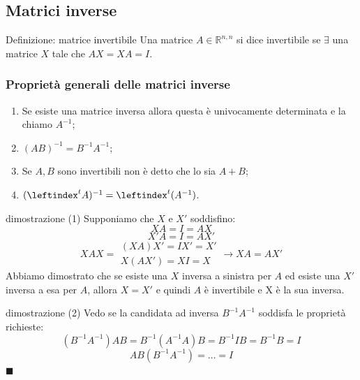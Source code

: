 \documentclass[x11names]{article}
\newcommand*{\QEDA}{\null\nobreak\hfill\ensuremath{\blacksquare}}%
\begin{document}
\subsection{Matrici inverse}
\begin{center}
\colorbox{Azure2}{\begin{minipage}{5.75in}
\begin{blues}{Definizione: matrice invertibile}
    Una matrice $A \in \mathbb{R}^{n,n}$ si dice invertibile se $\exists$ una matrice $X$ tale che $AX = XA = I$.
\end{blues}
\end{minipage}}        
\end{center}
\subsubsection*{Proprietà generali delle matrici inverse}
\begin{enumerate}
    \item Se esiste una matrice inversa allora questa è univocamente determinata e la chiamo $A^{-1}$;
    \item $(AB)^{-1} = B^{-1}A^{-1}$;
    \item Se $A,B$ sono invertibili non è detto che lo sia $A+B$;
    \item $(\leftindex ^t{A})^{-1} = \leftindex ^t(A^{-1})$.
\end{enumerate}



\begin{es}{dimostrazione (1)}
Supponiamo che $X$ e $X'$ soddisfino:
$$
XA = I = AX 
$$
$$
X' A = I = AX'
$$
$$
XAX = \begin{array}{c}
       (XA)X' = IX' = X' \\
       X(AX') = XI = X
    \end{array}
    \rightarrow
    XA = AX'
$$
Abbiamo dimostrato che se esiste una $X$ inversa a sinistra per $A$ ed esiste una $X' $ inversa a esa per $A$, allora $X=X'$ e quindi $A$ è invertibile e X è la sua inversa.
\end{es}
\begin{es}{dimostrazione (2)}
Vedo se la candidata ad inversa $B^{-1}A^{-1}$ soddisfa le proprietà richieste:
$$
(B^{-1}A^{-1})AB = B^{-1}(A^{-1}A)B = B^{-1}IB = B^{-1}B = I
$$
$$
AB(B^{-1}A^{-1})= \dots = I
$$
\QEDA
\end{es}
\end{document}
